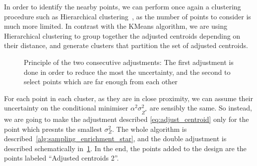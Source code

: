 \documentclass[../../Main_ManuscritThese.tex]{subfiles}
\newcommand\imgpath{/home/victor/acadwriting/Manuscrit/Text/Chapter4/img/}
\begin{document}
In order to identify the nearby points, we can perform once
again %
a clustering procedure such as Hierarchical
clustering~\cite{nielsen_hierarchical_2016}, as the number of points
to consider is much more limited. In contrast with the KMeans
algorithm, we are using Hierarchical clustering to group together the
adjusted centroids depending on their distance, and generate clusters
that partition the set of adjusted centroids.
\begin{figure}[ht]
  \centering
  \resizebox{0.9\textwidth}{!}{}
  \caption[Principle of the two consecutive adjustments for batch
  selection]{\label{fig:schema_double_adj} Principle of the two
    consecutive adjustments: The first adjustment is done in order to
    reduce the most the uncertainty, and the second to select points
    which are far enough from each other}
\end{figure}

For each point in each cluster, as they are in close proximity, we can
assume their uncertainty on the conditional minimiser
$\alpha^2\sigma^2_{Z^*}$ are sensibly the same. So instead, we are
going to make the adjustment described \cref{eq:adjust_centroid} only
for the point which presnts the smallest $\sigma^2_Z$.  The whole
algorithm is described~\cref{alg:sampling_enrichment_star}, and the
double adjustment is described schematically
in~\cref{fig:schema_double_adj}. In the end, the points added to the
design are the points labeled ``Adjusted centroids 2''.
\end{document}
